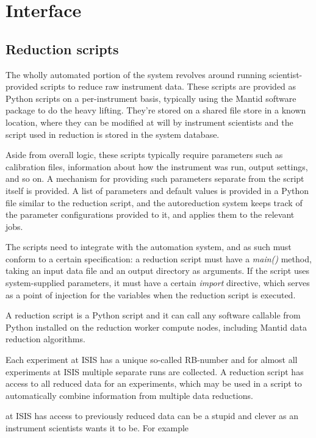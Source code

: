 \documentclass[twocolumn]{article}
\begin{document}
\section{Interface}\label{interface}

\subsection{Reduction scripts}\label{reduction-scripts}

The wholly automated portion of the system revolves around running
scientist-provided scripts to reduce raw instrument data. These scripts
are provided as Python scripts on a per-instrument basis, typically
using the Mantid software package to do the heavy lifting. They're
stored on a shared file store in a known location, where they can be
modified at will by instrument scientists and the script used in
reduction is stored in the system database.

Aside from overall logic, these scripts typically require parameters
such as calibration files, information about how the instrument was run,
output settings, and so on. A mechanism for providing such parameters 
separate from the script itself is provided. A list of parameters and
default values is provided in a Python file similar to the reduction
script, and the autoreduction system keeps track of the parameter
configurations provided to it, and applies them to the relevant jobs.

The scripts need to integrate with the automation system, and
as such must conform to a certain specification: a reduction script must have a
\emph{main()} method, taking an input data file and an output directory as
arguments. If the script uses system-supplied parameters, it must have a
certain \emph{import} directive, which serves as a point of injection
for the variables when the reduction script is executed.

A reduction script is a Python script and it can call any software 
callable from Python installed on the reduction worker compute nodes,
including Mantid data reduction algorithms.

Each experiment at ISIS has a unique so-called RB-number
and for almost all experiments at ISIS multiple separate runs are collected.
A reduction script has access to all reduced data for an experiments, which 
may be used in a script to automatically combine information from multiple 
data reductions.

at ISIS has access to previously reduced data can be a stupid and clever as an instrument
scientists wants it to be. For example
\end{document}
